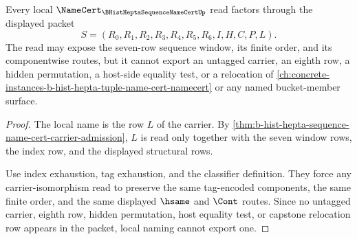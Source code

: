 \begin{theorem}
\label{thm:b-hist-hepta-sequence-name-cert-local-naming-nonescape}
Every local $\NameCert_{\BHistHeptaSequenceNameCertUp}$ read factors through the displayed packet
$$
S=(R_0,R_1,R_2,R_3,R_4,R_5,R_6,I,H,C,P,L).
$$
The read may expose the seven-row sequence window, its finite order, and its componentwise routes, but it cannot export an untagged carrier, an eighth row, a hidden permutation, a host-side equality test, or a relocation of \autoref{ch:concrete-instances-b-hist-hepta-tuple-name-cert-namecert} or any named bucket-member surface.
\end{theorem}
\begin{proof}
The local name is the row $L$ of the carrier. By \autoref{thm:b-hist-hepta-sequence-name-cert-carrier-admission}, $L$ is read only together with the seven window rows, the index row, and the displayed structural rows.

Use index exhaustion, tag exhaustion, and the classifier definition. They force any carrier-isomorphism read to preserve the same tag-encoded components, the same finite order, and the same displayed $\hsame$ and $\Cont$ routes. Since no untagged carrier, eighth row, hidden permutation, host equality test, or capstone relocation row appears in the packet, local naming cannot export one.
\end{proof}

